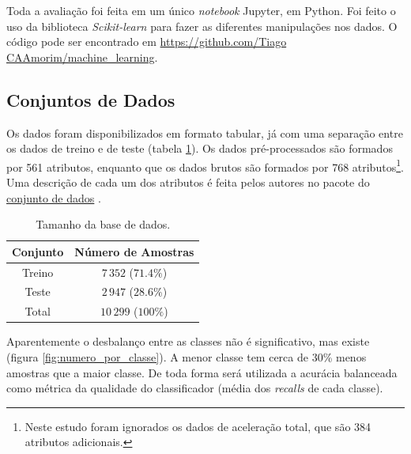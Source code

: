 \documentclass[final,5p]{elsarticle}
\numberwithin{equation}{section}
\begin{document}
    Toda a avaliação foi feita em um único \emph{notebook} Jupyter, em Python. Foi feito o uso da biblioteca \emph{Scikit-learn} \cite{scikit-learn} para fazer as diferentes manipulações nos dados. O código pode ser encontrado em \href{https://github.com/TiagoCAAmorim/machine_learning/blob/main/Lista02/Lista02.ipynb}{https://github.com/Tiago CAAmorim/machine\_learning}.

    \subsection{Conjuntos de Dados}

        Os dados foram disponibilizados em formato tabular, já com uma separação entre os dados de treino e de teste (tabela \ref{tab:total_dados}). Os dados pré-processados são formados por 561 atributos, enquanto que os dados brutos são formados por 768 atributos\footnote{Neste estudo foram ignorados os dados de aceleração total, que são 384 atributos adicionais.}. Uma descrição de cada um dos atributos é feita pelos autores no pacote do \href{https://github.com/TiagoCAAmorim/machine_learning/blob/main/Lista02/UCI_HAR_Dataset/features_info.txt}{conjunto de dados} \cite{anguita2013public}.
        \begin{table}[h]
            \centering
            \begin{tabular}{c c}
                \toprule
                \textbf{Conjunto} & \textbf{Número de Amostras} \\
                \midrule
                Treino & $7\,352$ ($71.4\%$) \\
                Teste & $2\,947$ ($28.6\%$) \\
                \addlinespace
                Total & $10\,299$ ($100\%$)\\
                \bottomrule
            \end{tabular}
            \caption{Tamanho da base de dados.}
            \label{tab:total_dados}
        \end{table}

        Aparentemente o desbalanço entre as classes não é significativo, mas existe (figura \ref{fig:numero_por_classe}). A menor classe tem cerca de 30\% menos amostras que a maior classe. De toda forma será utilizada a acurácia balanceada como métrica da qualidade do classificador (média dos \emph{recalls} de cada classe).
\end{document}
